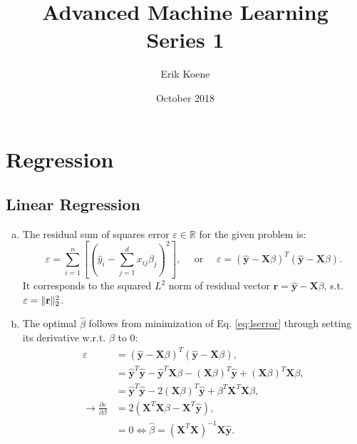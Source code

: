 \documentclass{article}
\title{\textbf{Advanced Machine  Learning}\\Series 1}
\author{Erik Koene}
\date{October 2018}
\DeclarePairedDelimiter\norm{\lVert}{\rVert}%
\begin{document}
\maketitle

\section{Regression}
\subsection{Linear Regression}
\begin{enumerate}[(a)]
    \item The residual sum of squares error $\varepsilon\in\mathbb{R}$ for the given problem is:
    \begin{equation}
        \varepsilon = \sum_{i=1}^n\left[\left( \hat{y}_i - \sum_{j=1}^d x_{ij}\beta_j \right)^2\right],\quad \text{ or }\quad \varepsilon = \left(\hat{\mathbf{y}}-\mathbf{X}\beta\right)^T\left(\hat{\mathbf{y}}-\mathbf{X}\beta\right). \label{eq:lserror}
    \end{equation}
    It corresponds to the squared $L^2$ norm of residual vector $\mathbf{r}=\hat{\mathbf{y}}-\mathbf{X}\beta$, s.t. $\varepsilon=\norm{\mathbf{r}}_2^2$.
    \item The optimal $\hat{\beta}$ follows from minimization of Eq. \eqref{eq:lserror} through setting its derivative w.r.t. $\beta$ to 0:
    \begin{align}
        \varepsilon & = \left(\hat{\mathbf{y}}-\mathbf{X}\beta\right)^T\left(\hat{\mathbf{y}}-\mathbf{X}\beta\right),\\
                    & = \hat{\mathbf{y}}^T\hat{\mathbf{y}} - \hat{\mathbf{y}}^T\mathbf{X}\beta - (\mathbf{X}\beta)^T\hat{\mathbf{y}} + (\mathbf{X}\beta)^T\mathbf{X}\beta,\\
                    & = \hat{\mathbf{y}}^T\hat{\mathbf{y}} - 2 (\mathbf{X}\beta)^T\hat{\mathbf{y}} + \beta^T\mathbf{X}^T\mathbf{X}\beta,\\
                \to \frac{\partial \varepsilon}{\partial \beta} & =  2(\mathbf{X}^T\mathbf{X}\beta - \mathbf{X}^T\hat{\mathbf{y}}),\\
                &= 0 \Longleftrightarrow \hat{\beta}  = (\mathbf{X}^T\mathbf{X})^{-1}\mathbf{X}\hat{\mathbf{y}}. 
    \end{align}
\end{enumerate}
\end{document}
